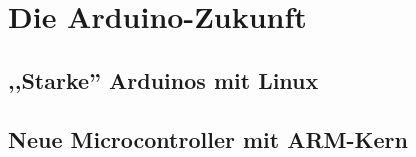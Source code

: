 \section{Die Arduino-Zukunft}

\subsection{,,Starke'' Arduinos mit Linux}
\subsection{Neue Microcontroller mit ARM-Kern}